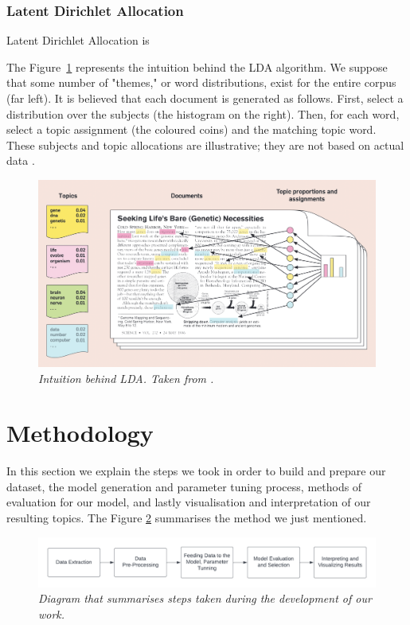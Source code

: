 \documentclass[twoside,12pt,a4paper]{article}
\begin{document}
\subsubsection{Latent Dirichlet Allocation}
Latent Dirichlet Allocation is 

The Figure~\ref{fig:lda} represents the intuition behind the LDA algorithm. We suppose that some number of "themes," or word distributions, exist for the entire corpus (far left).
It is believed that each document is generated as follows. First, select a distribution over the subjects (the histogram on the right). Then, for each word, select a topic assignment (the coloured coins) and the matching topic word. These subjects and topic allocations are illustrative; they are not based on actual data \citep{blei_probabilistic_2012}.

\begin{figure}[h]
\centering
\includegraphics[scale=0.4]{lda.png}
\caption{\textit{Intuition behind LDA. Taken from \citep{blei_probabilistic_2012}.}}
\label{fig:lda}
\end{figure}

\clearpage
\section{Methodology}
In this section we explain the steps we took in order to build and prepare our dataset, the model generation and parameter tuning process, methods of evaluation for our model, and lastly visualisation and interpretation of our resulting topics. The Figure \ref{fig:method_1} summarises the method we just mentioned.\\

\begin{figure}[h]
\centering
\includegraphics[scale=0.6]{method_1.png}
\caption{\textit{Diagram that summarises steps taken during the development of our work.}}
\label{fig:method_1}
\end{figure}
\end{document}
